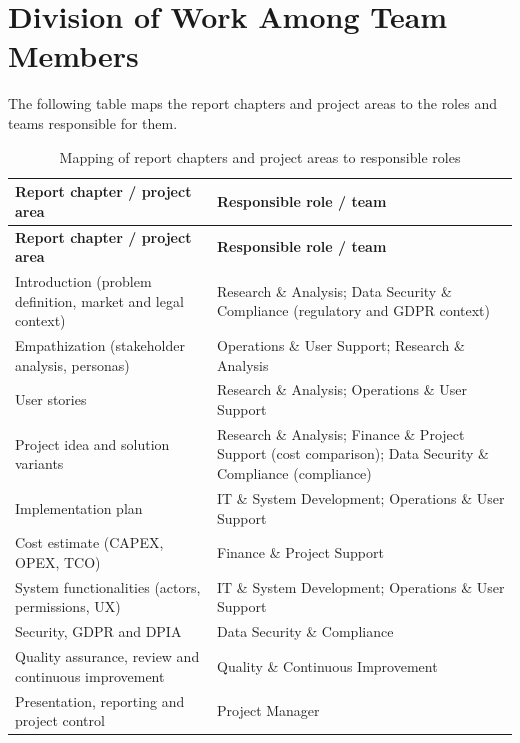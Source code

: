 \section*{Division of Work Among Team Members}

The following table maps the report chapters and project areas to the roles and
teams responsible for them.

\begin{longtable}{|L{6.6cm}|L{8.4cm}|}
\caption{Mapping of report chapters and project areas to responsible roles}
\label{tab:division_of_work} \\
\hline

\textbf{Report chapter / project area} &
\textbf{Responsible role / team} \\
\hline

\endfirsthead

\hline

\textbf{Report chapter / project area} &
\textbf{Responsible role / team} \\
\hline

\endhead

Introduction (problem definition, market and legal context) &
Research \& Analysis; Data Security \& Compliance (regulatory and GDPR context) \\
\hline

Empathization (stakeholder analysis, personas) &
Operations \& User Support; Research \& Analysis \\
\hline

User stories &
Research \& Analysis; Operations \& User Support \\
\hline

Project idea and solution variants &
Research \& Analysis; Finance \& Project Support (cost comparison);
Data Security \& Compliance (compliance) \\
\hline

Implementation plan &
IT \& System Development; Operations \& User Support \\
\hline

Cost estimate (CAPEX, OPEX, TCO) &
Finance \& Project Support \\
\hline

System functionalities (actors, permissions, UX) &
IT \& System Development; Operations \& User Support \\
\hline

Security, GDPR and DPIA &
Data Security \& Compliance \\
\hline

Quality assurance, review and continuous improvement &
Quality \& Continuous Improvement \\
\hline

Presentation, reporting and project control &
Project Manager \\
\hline

\end{longtable}
